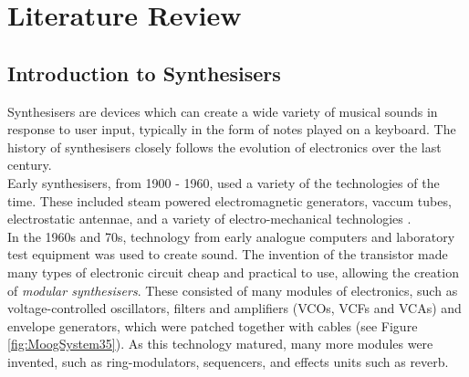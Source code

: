 \documentclass[11pt, oneside]{report}   	%
\begin{document}
\chapter{Literature Review}
\section{Introduction to Synthesisers}
Synthesisers are devices which can create a wide variety of musical sounds in response to  user input, typically in the form of notes played on a keyboard. The history of synthesisers closely follows the evolution of electronics over the last century.\\
Early synthesisers, from 1900 - 1960, used a variety of the technologies of the time. These included steam powered electromagnetic generators, vaccum tubes, electrostatic antennae, and a variety of electro-mechanical technologies \cite{AppleSynth}.\\
In the 1960s and 70s, technology from early analogue computers and laboratory test equipment was used to create sound. The invention of the transistor made many types of electronic circuit cheap and practical to use, allowing the creation of  \emph{modular synthesisers}. These consisted of many modules of electronics, such as voltage-controlled oscillators, filters and amplifiers (VCOs, VCFs and VCAs) and envelope generators, which were patched together with cables (see Figure \ref{fig:MoogSystem35}). As this technology matured, many more modules were invented, such as ring-modulators, sequencers, and effects units such as reverb.
%
\end{document}
